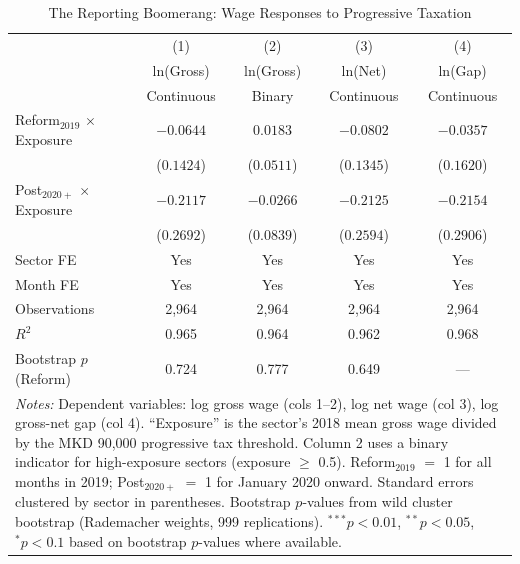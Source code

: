 \begin{table}[htbp]
\centering
\caption{The Reporting Boomerang: Wage Responses to Progressive Taxation}
\label{tab:main}
\begin{tabular}{lcccc}
\hline\hline
 & (1) & (2) & (3) & (4) \\
 & ln(Gross) & ln(Gross) & ln(Net) & ln(Gap) \\
 & Continuous & Binary & Continuous & Continuous \\
\hline
Reform$_{2019}$ $\times$ Exposure & $-0.0644$ & $0.0183$ & $-0.0802$ & $-0.0357$ \\
 & ($0.1424$) & ($0.0511$) & ($0.1345$) & ($0.1620$) \\
Post$_{2020+}$ $\times$ Exposure & $-0.2117$ & $-0.0266$ & $-0.2125$ & $-0.2154$ \\
 & ($0.2692$) & ($0.0839$) & ($0.2594$) & ($0.2906$) \\
\hline
Sector FE & Yes & Yes & Yes & Yes \\
Month FE & Yes & Yes & Yes & Yes \\
Observations & 2,964 & 2,964 & 2,964 & 2,964 \\
$R^2$ & 0.965 & 0.964 & 0.962 & 0.968 \\
Bootstrap $p$ (Reform) & 0.724 & 0.777 & 0.649 & --- \\
\hline\hline
\multicolumn{5}{p{0.95\textwidth}}{\footnotesize \textit{Notes:} Dependent variables: log gross wage (cols 1--2), log net wage (col 3), log gross-net gap (col 4). ``Exposure'' is the sector's 2018 mean gross wage divided by the MKD 90,000 progressive tax threshold. Column 2 uses a binary indicator for high-exposure sectors (exposure $\geq$ 0.5). Reform$_{2019}$ $=$ 1 for all months in 2019; Post$_{2020+}$ $=$ 1 for January 2020 onward. Standard errors clustered by sector in parentheses. Bootstrap $p$-values from wild cluster bootstrap (Rademacher weights, 999 replications). $^{***}p<0.01$, $^{**}p<0.05$, $^{*}p<0.1$ based on bootstrap $p$-values where available.}
\end{tabular}
\end{table}

